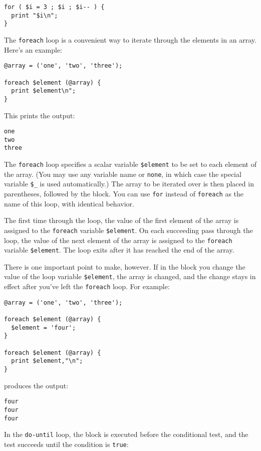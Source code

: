 \begin{lstlisting}
for ( $i = 3 ; $i ; $i-- ) {
  print "$i\n";
}
\end{lstlisting}

The \verb|foreach| loop is a convenient way to iterate through the elements in an array. Here's an example:

\begin{lstlisting}
@array = ('one', 'two', 'three');

foreach $element (@array) {
  print $element\n";
}
\end{lstlisting}

This prints the output:

\begin{lstlisting}
one
two
three
\end{lstlisting}

The \verb|foreach| loop specifies a scalar variable \verb|$element| to be set to each element of the array. (You may use any variable name or \verb|none|, in which case the special variable \verb|$_| is used automatically.) The array to be iterated over is then placed in parentheses, followed by the block. You can use \verb|for| instead of \verb|foreach| as the name of this loop, with identical behavior.

The first time through the loop, the value of the first element of the array is assigned to the \verb|foreach| variable \verb|$element|. On each succeeding pass through the loop, the value of the next element of the array is assigned to the \verb|foreach| variable \verb|$element|. The loop exits after it has reached the end of the array.

There is one important point to make, however. If in the block you change the value of the loop variable \verb|$element|, the array is changed, and the change stays in effect after you've left the \verb|foreach| loop. For example:

\begin{lstlisting}
@array = ('one', 'two', 'three');

foreach $element (@array) {
  $element = 'four';
}

foreach $element (@array) {
  print $element,"\n";
}
\end{lstlisting}

produces the output:

\begin{lstlisting}
four
four
four
\end{lstlisting}

In the \verb|do-until| loop, the block is executed before the conditional test,
and the test succeeds until the condition is \verb|true|:

